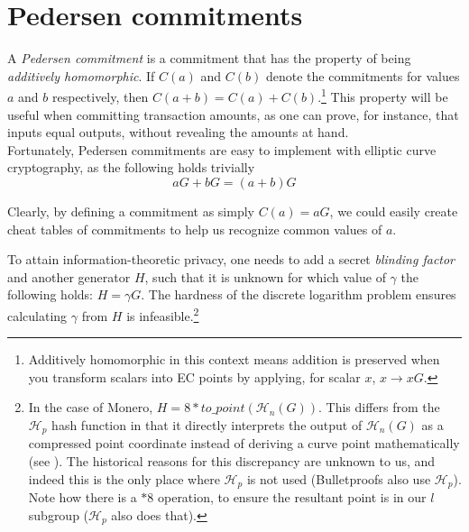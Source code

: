 \section{Pedersen commitments}
\label{pedersen_section}

A {\em Pedersen commitment} \cite{Pedersen1992} is a commitment that has the property of being {\em additively homomorphic}. If \(C(a)\) and \(C(b)\) denote the commitments for values \(a\) and \(b\) respectively, then \(C(a + b) = C(a) + C(b)\).\footnote{Additively homomorphic in this context means addition is preserved when you transform scalars into EC points by applying, for scalar $x$, $x \rightarrow x G$.} This property will be useful when committing transaction amounts, as one can prove, for instance, that inputs equal outputs, without revealing the amounts at hand.
\\

Fortunately, Pedersen commitments are easy to implement with elliptic curve cryptography, as the following holds trivially \[a G + b G = (a + b) G\]

Clearly, by defining a commitment as simply \(C(a) = a G\), we could easily create cheat tables of commitments to help us recognize common values of $a$.

To attain information-theoretic privacy, one needs to add a secret {\em blinding factor} and another generator \(H\), such that it is unknown for which value of \(\gamma\) the following holds: \(H = \gamma G\). The hardness of the discrete logarithm problem ensures calculating $\gamma$ from $H$ is infeasible.\footnote{In the case of Monero, $H = 8*to\_point(\mathcal{H}_n(G))$. This differs from the $\mathcal{H}_p$ hash function in that it directly interprets the output of $\mathcal{H}_n(G)$ as a compressed point coordinate instead of deriving a curve point mathematically (see \cite{hashtopoint-writeup}). The historical reasons for this discrepancy are unknown to us, and indeed this is the only place where $\mathcal{H}_p$ is not used (Bulletproofs also use $\mathcal{H}_p$). Note how there is a $*8$ operation, to ensure the resultant point is in our $l$ subgroup ($\mathcal{H}_p$ also does that).}



